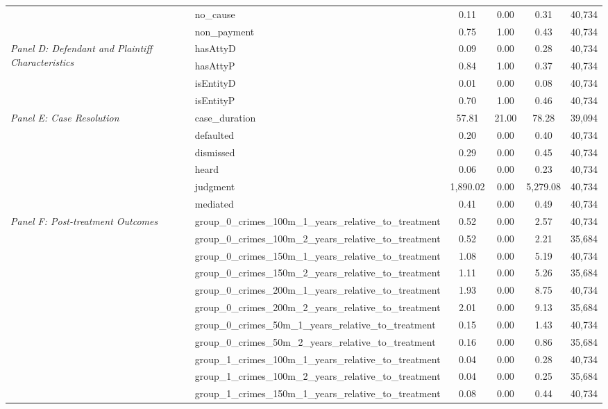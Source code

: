 \begin{tabular}{llcccc}
 & no_cause & 0.11 & 0.00 & 0.31 & 40,734 \\
 & non_payment & 0.75 & 1.00 & 0.43 & 40,734 \\
\cline{1-6}
\multirow[c]{4}{4cm}{\textit{Panel D: Defendant and Plaintiff Characteristics}} & hasAttyD & 0.09 & 0.00 & 0.28 & 40,734 \\
 & hasAttyP & 0.84 & 1.00 & 0.37 & 40,734 \\
 & isEntityD & 0.01 & 0.00 & 0.08 & 40,734 \\
 & isEntityP & 0.70 & 1.00 & 0.46 & 40,734 \\
\cline{1-6}
\multirow[c]{6}{4cm}{\textit{Panel E: Case Resolution}} & case_duration & 57.81 & 21.00 & 78.28 & 39,094 \\
 & defaulted & 0.20 & 0.00 & 0.40 & 40,734 \\
 & dismissed & 0.29 & 0.00 & 0.45 & 40,734 \\
 & heard & 0.06 & 0.00 & 0.23 & 40,734 \\
 & judgment & 1,890.02 & 0.00 & 5,279.08 & 40,734 \\
 & mediated & 0.41 & 0.00 & 0.49 & 40,734 \\
\cline{1-6}
\multirow[c]{34}{4cm}{\textit{Panel F: Post-treatment Outcomes}} & group_0_crimes_100m_1_years_relative_to_treatment & 0.52 & 0.00 & 2.57 & 40,734 \\
 & group_0_crimes_100m_2_years_relative_to_treatment & 0.52 & 0.00 & 2.21 & 35,684 \\
 & group_0_crimes_150m_1_years_relative_to_treatment & 1.08 & 0.00 & 5.19 & 40,734 \\
 & group_0_crimes_150m_2_years_relative_to_treatment & 1.11 & 0.00 & 5.26 & 35,684 \\
 & group_0_crimes_200m_1_years_relative_to_treatment & 1.93 & 0.00 & 8.75 & 40,734 \\
 & group_0_crimes_200m_2_years_relative_to_treatment & 2.01 & 0.00 & 9.13 & 35,684 \\
 & group_0_crimes_50m_1_years_relative_to_treatment & 0.15 & 0.00 & 1.43 & 40,734 \\
 & group_0_crimes_50m_2_years_relative_to_treatment & 0.16 & 0.00 & 0.86 & 35,684 \\
 & group_1_crimes_100m_1_years_relative_to_treatment & 0.04 & 0.00 & 0.28 & 40,734 \\
 & group_1_crimes_100m_2_years_relative_to_treatment & 0.04 & 0.00 & 0.25 & 35,684 \\
 & group_1_crimes_150m_1_years_relative_to_treatment & 0.08 & 0.00 & 0.44 & 40,734 \\

\end{tabular}
